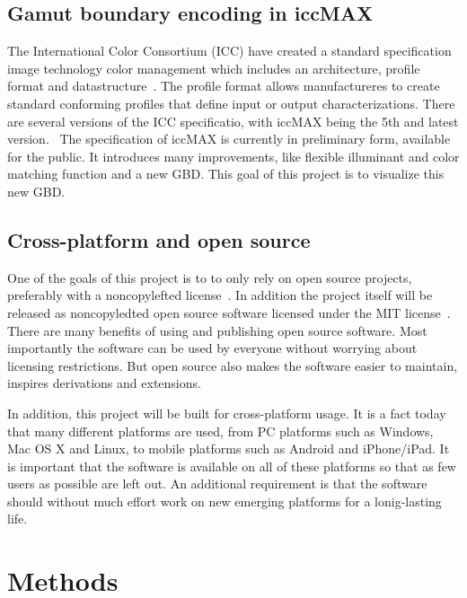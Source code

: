 \subsection{Gamut boundary encoding in iccMAX}
The International Color Consortium (ICC) have created a standard specification image technology color management which includes an architecture, profile format and datastructure~\cite{ColorManagement}.
The profile format allows manufactureres to create standard conforming profiles that define input or output characterizations.
There are several versions of the ICC specificatio, with iccMAX being the 5th and latest version.~\cite{IccMax}
The specification of iccMAX is currently in preliminary form, available for the public.
It introduces many improvements, like flexible illuminant and color matching function and a new GBD.
This goal of this project is to visualize this new GBD.

\subsection{Cross-platform and open source}
\label{sec:crossplatform-open}
One of the goals of this project is to to only rely on open source projects, preferably with a noncopylefted license~\cite{GnuFreeCategories}.
In addition the project itself will be released as noncopyledted open source software licensed under the MIT license~\cite{MitLicense}.
There are many benefits of using and publishing open source software.
Most importantly the software can be used by everyone without worrying about licensing restrictions.
But open source also makes the software easier to maintain, inspires derivations and extensions.

In addition, this project will be built for cross-platform usage.
It is a fact today that many different platforms are used, from PC platforms such as Windows, Mac OS X and Linux, to mobile platforms such as Android and iPhone/iPad.
It is important that the software is available on all of these platforms so that as few users as possible are left out.
An additional requirement is that the software should without much effort work on new emerging platforms for a lonig-lasting life.

\section{Methods}

